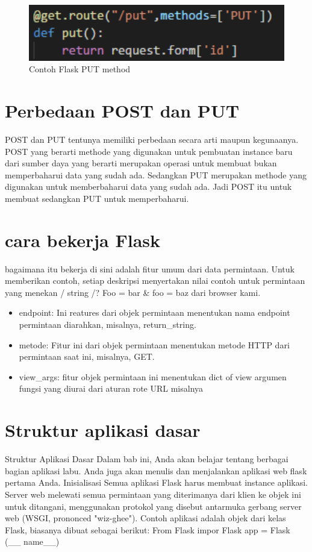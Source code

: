 \begin{figure}[ht]
    \centerline{\includegraphics[width=1\textwidth]{figures/3put.PNG}}
    \caption{Contoh Flask PUT method}
    \label{4PUT}
\end{figure}

\section{Perbedaan POST dan PUT}
POST dan PUT tentunya memiliki perbedaan secara arti maupun kegunaanya. POST yang berarti methode yang digunakan untuk pembuatan
instance baru dari sumber daya yang berarti merupakan operasi untuk membuat bukan memperbaharui data yang sudah ada. 
Sedangkan PUT merupakan methode yang digunakan untuk memberbaharui data yang sudah ada. Jadi POST itu untuk membuat 
sedangkan PUT untuk memperbaharui.

\section{cara bekerja Flask}
bagaimana itu bekerja
 di sini adalah fitur umum dari data permintaan. Untuk memberikan contoh, setiap deskripsi menyertakan nilai contoh untuk permintaan yang menekan / string /? Foo = bar & foo = baz dari browser kami.    
\begin{itemize}
\item endpoint: Ini reatures dari objek permintaan menentukan nama endpoint permintaan diarahkan, misalnya, return_string.    
\item metode: Fitur ini dari objek permintaan menentukan metode HTTP dari permintaan saat ini, misalnya, GET.   
\item view_args: fitur objek permintaan ini menentukan dict of view argumen fungsi yang diurai dari aturan rote URL misalnya 
\end{itemize}

\section{Struktur aplikasi dasar}
Struktur Aplikasi Dasar 
Dalam bab ini, Anda akan belajar tentang berbagai bagian aplikasi labu. Anda juga akan menulis dan menjalankan aplikasi web flask pertama Anda. 
Inisialisasi 
Semua aplikasi Flask harus membuat instance aplikasi. Server web melewati semua permintaan yang diterimanya dari klien ke objek ini untuk ditangani, menggunakan protokol yang disebut antarmuka gerbang server web (WSGI, prononced "wiz-ghee"). Contoh aplikasi adalah objek dari kelas Flask, biasanya dibuat sebagai berikut: 
From Flask impor Flask 
app = Flask (__ name__)

